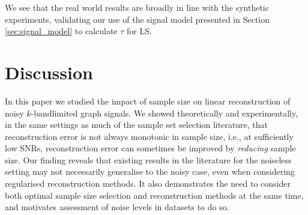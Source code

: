 {We see that the real world results are broadly in line with the synthetic experiments, validating our use of the signal model presented in Section \ref{sec:signal_model} to calculate $\tau$ for LS.

\section{Discussion}
In this paper we studied the impact of sample size on linear reconstruction of noisy $k$-bandlimited graph signals. We showed theoretically and experimentally, in the same settings as much of the sample set selection literature, that reconstruction error is not always monotonic in sample size, i.e., at sufficiently low SNRs, reconstruction error can sometimes be improved by \emph{reducing} sample size. %
Our finding reveals that existing results in the literature for the noiseless setting may not necessarily generalise to the noisy case,  even when considering regularised reconstruction methods. It also demonstrates the need to consider both optimal sample size selection and reconstruction methods at the same time, and motivates assessment of noise levels in datasets to do so. %



}
